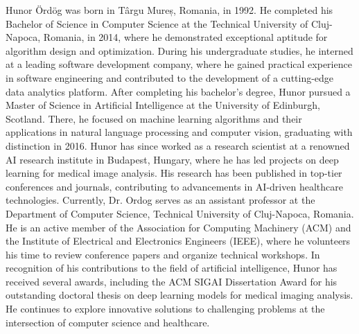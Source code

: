 \documentclass[journal,twoside,web]{ieeecolor}
\begin{document}
\begin{IEEEbiography}{Hunor Ördög} was born in Târgu Mureș, Romania, in 1992. He completed his Bachelor of Science in Computer Science at the Technical University of Cluj-Napoca, Romania, in 2014, where he demonstrated exceptional aptitude for algorithm design and optimization.
    During his undergraduate studies, he interned at a leading software development company, where he gained practical experience in software engineering and contributed to the development of a cutting-edge data analytics platform.
    After completing his bachelor's degree, Hunor pursued a Master of Science in Artificial Intelligence at the University of Edinburgh, Scotland. There, he focused on machine learning algorithms and their applications in natural language processing and computer vision, graduating with distinction in 2016.
    Hunor has since worked as a research scientist at a renowned AI research institute in Budapest, Hungary, where he has led projects on deep learning for medical image analysis. His research has been published in top-tier conferences and journals, contributing to advancements in AI-driven healthcare technologies.
    Currently, Dr. Ordog serves as an assistant professor at the Department of Computer Science, Technical University of Cluj-Napoca, Romania. He is an active member of the Association for Computing Machinery (ACM) and the Institute of Electrical and Electronics Engineers (IEEE), where he volunteers his time to review conference papers and organize technical workshops.
    In recognition of his contributions to the field of artificial intelligence, Hunor has received several awards, including the ACM SIGAI Dissertation Award for his outstanding doctoral thesis on deep learning models for medical imaging analysis. He continues to explore innovative solutions to challenging problems at the intersection of computer science and healthcare.
\end{IEEEbiography}
\end{document}
